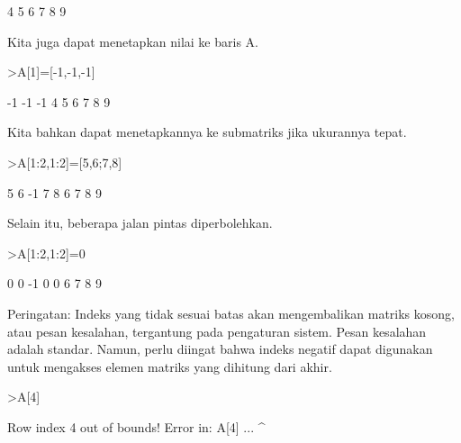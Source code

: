 \documentclass[a4paper,10pt]{article}
\begin{document}
\begin{eulernotebook}
\begin{eulercomment}
\begin{eulercomment}
\begin{eulercomment}
\begin{eulercomment}
\begin{eulercomment}
\begin{eulercomment}
\begin{euleroutput}
              4             5             6 
              7             8             9 
\end{euleroutput}
\begin{eulercomment}
Kita juga dapat menetapkan nilai ke baris A.
\end{eulercomment}
\begin{eulerprompt}
>A[1]=[-1,-1,-1]
\end{eulerprompt}
\begin{euleroutput}
             -1            -1            -1 
              4             5             6 
              7             8             9 
\end{euleroutput}
\begin{eulercomment}
Kita bahkan dapat menetapkannya ke submatriks jika ukurannya tepat.
\end{eulercomment}
\begin{eulerprompt}
>A[1:2,1:2]=[5,6;7,8]
\end{eulerprompt}
\begin{euleroutput}
              5             6            -1 
              7             8             6 
              7             8             9 
\end{euleroutput}
\begin{eulercomment}
Selain itu, beberapa jalan pintas diperbolehkan.
\end{eulercomment}
\begin{eulerprompt}
>A[1:2,1:2]=0
\end{eulerprompt}
\begin{euleroutput}
              0             0            -1 
              0             0             6 
              7             8             9 
\end{euleroutput}
\begin{eulercomment}
Peringatan: Indeks yang tidak sesuai batas akan mengembalikan matriks
kosong, atau pesan kesalahan, tergantung pada pengaturan sistem. Pesan
kesalahan adalah standar. Namun, perlu diingat bahwa indeks negatif
dapat digunakan untuk mengakses elemen matriks yang dihitung dari
akhir.
\end{eulercomment}
\begin{eulerprompt}
>A[4]
\end{eulerprompt}
\begin{euleroutput}
  Row index 4 out of bounds!
  Error in:
  A[4] ...
      ^
\end{euleroutput}
\begin{eulercomment}

\end{eulercomment}
\end{eulercomment}
\end{eulercomment}
\end{eulercomment}
\end{eulercomment}
\end{eulercomment}
\end{eulercomment}
\end{eulernotebook}
\end{document}

